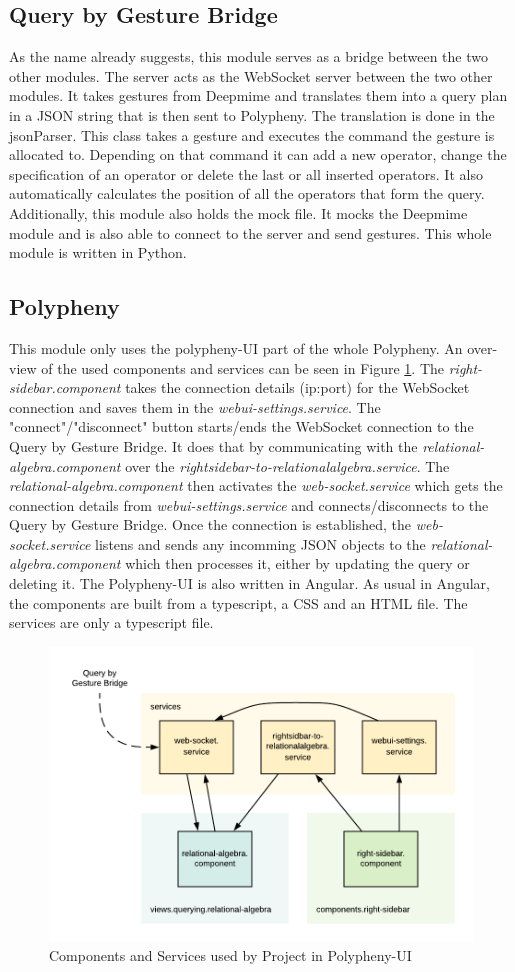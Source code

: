\subsection{Query by Gesture Bridge}
As the name already suggests, this module serves as a bridge between the two other modules. The server acts as the WebSocket server between the two other modules. It takes gestures from Deepmime and translates them into a query plan in a JSON string that is then sent to Polypheny. The translation is done in the jsonParser. This class takes a gesture and executes the command the gesture is allocated to. Depending on that command it can add a new operator, change the specification of an operator or delete the last or all inserted operators. It also automatically calculates the position of all the operators that form the query. Additionally, this module also holds the mock file. It mocks the Deepmime module and is also able to connect to the server and send gestures. This whole module is written in Python.


\subsection{Polypheny}
This module only uses the polypheny-UI part of the whole Polypheny. An over-view of the used components and services can be seen in Figure \ref{fig:polypheny_architecture}. The \textit{right-sidebar.component} takes the connection details (ip:port) for the WebSocket connection and saves them in the \textit{webui-settings.service}. The "connect"/"disconnect" button starts/ends the WebSocket connection to the Query by Gesture Bridge. It does that by communicating with the \textit{relational-algebra.component} over the \textit{rightsidebar-to-relationalalgebra.service}. The \textit{relational-algebra.component} then activates the \textit{web-socket.service} which gets the connection details from \textit{webui-settings.service} and connects/disconnects to the Query by Gesture Bridge. Once the connection is established, the \textit{web-socket.service} listens and sends any incomming JSON objects to the \textit{relational-algebra.component} which then processes it, either by updating the query or deleting it. The Polypheny-UI is also written in Angular. As usual in Angular, the components are built from a typescript, a CSS and an HTML file. The services are only a typescript file.

\begin{figure}[H]
    \centering
    \includegraphics[width=\textwidth]{reportContent/images/PolyphenySchema.png}
    \caption{Components and Services used by Project in Polypheny-UI}
    \label{fig:polypheny_architecture}
\end{figure}{}